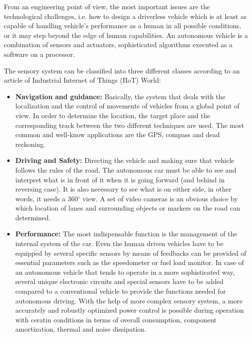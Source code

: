 \documentclass[12pt,english,twoside]{article}
\begin{document}
From an engineering point of view, the most important issues are the technological challenges, i.e. how to design a driverless vehicle which is at least as capable of handling vehicle's performance as a human in all possible conditions, or it may step beyond the edge of human capabilities. An autonomous vehicle is a combination of sensors and actuators, sophisticated algorithms executed as a software on a processor.

The sensory system can be classified into three different classes according to an article of Industrial Internet of Things (IIoT) World: \cite{5c}
\begin{itemize}
	\item \textbf{Navigation and guidance:} Basically, the system that deals with the localization and the control of movements of vehicles from a global point of view. In order to determine the location, the target place and the corresponding track between the two different techniques are used. The most common and well-know applications are the GPS, compass and dead reckoning.
	\item \textbf{Driving and Safety:} Directing the vehicle and making sure that vehicle follows the rules of the road. The autonomous car must be able to see and interpret what is in front of it when it is going forward (and behind in reversing case). It is also necessary to see what is on either side, in other words, it needs a 360$^{\circ}$ view. A set of video cameras is an obvious choice by which location of lanes and surrounding objects or markers on the road can determined.
	\item \textbf{Performance:} The most indispensable function is the management of the internal system of the car. Even the human driven vehicles have to be equipped by several specific sensors by means of feedbacks can be provided of essential parameters such as the speedometer or fuel load monitor. In case of an autonomous vehicle that tends to operate in a more sophisticated way, several unique electronic circuits and special sensors have to be added compared to a conventional vehicle to provide the functions needed for autonomous driving. With the help of more complex sensory system, a more accurately and robustly optimized power control is possible during operation with ceratin conditions in terms of overall consumption, component amortization, thermal and noise dissipation.
\end{itemize}
\end{document}
